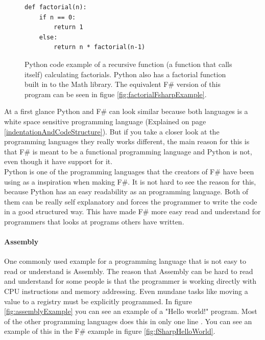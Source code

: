 \documentclass[12pt, a4paper]{article}
\begin{document}

\begin{figure}[!h]
	\begin{lstlisting}
def factorial(n):
    if n == 0:
        return 1
    else:
        return n * factorial(n-1)
	\end{lstlisting}
	\caption{Python code example of a recursive function (a function that calls itself) calculating factorials. Python also has a factorial function built in to the Math library. The equivalent F\# version of this program can be seen in figue \ref{fig:factorialFsharpExample}.}
	\label{fig:pythonFactorial}
\end{figure}

At a first glance Python and F\# can look similar because both languages is a white space sensitive programming language (Explained on page \ref{indentationAndCodeStructure}). But if you take a closer look at the programming languages they really works different, the main reason for this is that F\# is meant to be a functional programming language and Python is not, even though it have support for it.\\

Python is one of the programming languages that the creators of F\# have been using as a inspiration when making F\#. It is not hard to see the reason for this, because Python has an easy readability as an programming language. Both of them can be really self explanatory and forces the programmer to  write the code in a good structured way. This have made F\# more easy read and understand for programmers that looks at programs others have written.

\newpage
\paragraph{Assembly} One commonly used example for a programming language that is not easy to read or understand is Assembly. The reason that Assembly can be hard to read and understand for some people is that the programmer is working directly with CPU instructions and memory addressing. Even mundane tasks like moving a value to a registry must be explicitly programmed. In figure \ref{fig:assemblyExample} you can see an example of a "Hello world!" program. Most of the other programming languages does this in only one line . You can see an example of this in the F\# example in figure \ref{fig:fSharpHelloWorld}.\\
\end{document}
